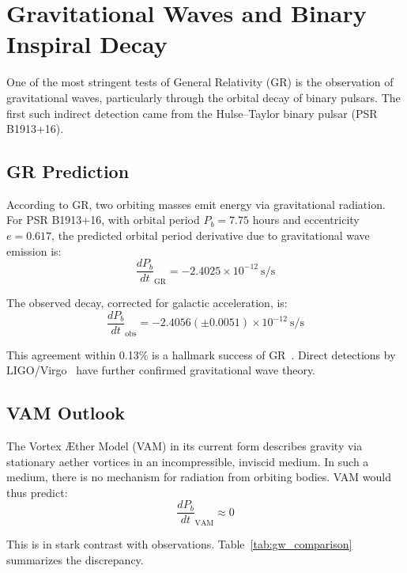 \section{Gravitational Waves and Binary Inspiral Decay}

One of the most stringent tests of General Relativity (GR) is the observation of gravitational waves, particularly through the orbital decay of binary pulsars. The first such indirect detection came from the Hulse--Taylor binary pulsar (PSR B1913+16).

\subsection*{GR Prediction}

According to GR, two orbiting masses emit energy via gravitational radiation. For PSR B1913+16, with orbital period $P_b = 7.75$ hours and eccentricity $e = 0.617$, the predicted orbital period derivative due to gravitational wave emission is:
\begin{equation}
    \frac{dP_b}{dt}_{\text{GR}} = -2.4025\times10^{-12} \ \text{s/s}
\end{equation}

The observed decay, corrected for galactic acceleration, is:
\begin{equation}
    \frac{dP_b}{dt}_{\text{obs}} = -2.4056(\pm 0.0051)\times10^{-12} \ \text{s/s}
\end{equation}

This agreement within 0.13\% is a hallmark success of GR~\cite{weisberg2016}. Direct detections by LIGO/Virgo~\cite{abbott2016} have further confirmed gravitational wave theory.

\subsection*{VAM Outlook}

The Vortex Æther Model (VAM) in its current form describes gravity via stationary aether vortices in an incompressible, inviscid medium. In such a medium, there is no mechanism for radiation from orbiting bodies. VAM would thus predict:
\begin{equation}
    \frac{dP_b}{dt}_{\text{VAM}} \approx 0
\end{equation}

This is in stark contrast with observations. Table~\ref{tab:gw_comparison} summarizes the discrepancy.

